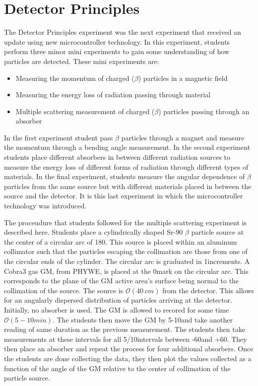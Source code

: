 \section{Detector Principles}
The Detector Principles experiment was the next experiment that received an update using new microcontroller technology.
In this experiment, students perform three minor mini experiments to gain some understanding of how particles are detected.
These mini experiments are:
\begin{itemize}
\item Measuring the momentum of charged ($\beta$) particles in a magnetic field
\item Measuring the energy loss of radiation passing through material
\item Multiple scattering measurement of charged ($\beta$) particles passing through an absorber
\end{itemize}

In the first experiment student pass $\beta$ particles through a magnet and measure the momentum through a bending angle measurement.
In the second experiment students place different absorbers in between different radiation sources to measure the energy loss of different forms of radiation through different types of materials.
In the final experiment, students measure the angular dependence of $\beta$ particles from the same source but with different materials placed in between the source and the detector.
It is this last experiment in which the microcontroller technology was introduced.

The proceudure that students followed for the multiple scattering experiment is described here.
Students place a cylindrically shaped Sr-90 $\beta$ particle source at the center of a circular arc of 180\textdegree.
This source is placed within an aluminum collimator such that the particles escaping the collimation are those from one of the circular ends of the cylinder.
The circular arc is graduated in 1\textdegree increments.
A Cobra3 gas GM, from PHYWE, is placed at the 0\textdegree mark on the circular arc.
This corresponds to the plane of the GM active area's surface being normal to the collimation of the source.
The source is $\mathcal{O}(40~cm)$ from the detector.
This allows for an angularly dispersed distribution of particles arriving at the detector.
Initially, no absorber is used.
The GM is allowed to recored for some time $\mathcal{O}(5-10 min)$.
The students then move the GM by 5-10\textdegree and take another reading of same duration as the previous measurement.
The students then take measurements at these intervals for all 5/10\textdegree intervals between -60\textdegree and +60\textdegree.
They then place an absorber and repeat the process for four additional absorbers.
Once the students are done collecting the data, they then plot the values collected as a function of the angle of the GM relative to the center of collimation of the particle source.


